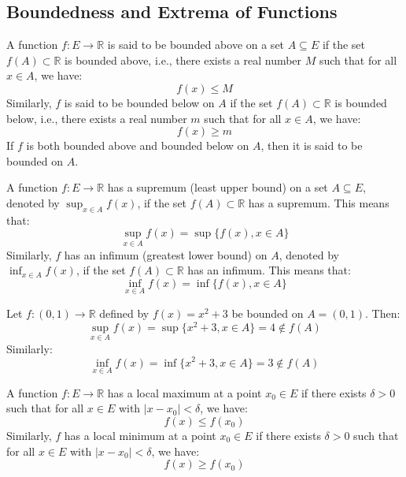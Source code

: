 \subsection{Boundedness and Extrema of Functions}
\begin{definition}
    A function $f : E \to \mathbb{R}$ is said to be bounded above on a set $A \subseteq E$ if the set $f(A) \subset \mathbb{R}$ is bounded above, i.e., there exists a real number $M$ such that for all $x \in A$, we have:
    \[
        f(x) \leq M
    \]
    Similarly, $f$ is said to be bounded below on $A$ if the set $f(A) \subset \mathbb{R}$ is bounded below, i.e., there exists a real number $m$ such that for all $x \in A$, we have:
    \[
        f(x) \geq m
    \]
    If $f$ is both bounded above and bounded below on $A$, then it is said to be bounded on $A$.
\end{definition}

\begin{definition}
    A function $f : E \to \mathbb{R}$ has a supremum (least upper bound) on a set $A \subseteq E$, denoted by $\sup_{x \in A} f(x)$, if the set $f(A) \subset \mathbb{R}$ has a supremum. This means that:
    \[
        \sup_{x \in A} f(x) = \sup \{f(x), x \in A\}
    \]
    Similarly, $f$ has an infimum (greatest lower bound) on $A$, denoted by $\inf_{x \in A} f(x)$, if the set $f(A) \subset \mathbb{R}$ has an infimum. This means that:
    \[
        \inf_{x \in A} f(x) = \inf \{f(x), x \in A\}
    \]
\end{definition}
\begin{eg}
    Let $f: (0,1) \to \mathbb{R}$ defined by $f(x) = x^2 + 3$ be bounded on $A = (0,1)$. Then:
    \[
        \sup_{x \in A} f(x) = \sup \{x^2 + 3, x \in A\} = 4 \notin f(A)
    \]
    Similarly:
    \[
        \inf_{x \in A} f(x) = \inf \{x^2 + 3, x \in A\} = 3 \notin f(A)
    \]
\end{eg}

\begin{definition}
    A function $f: E \to \mathbb{R}$ has a local maximum at a point $x_0 \in E$ if there exists $\delta > 0$ such that for all $x \in E$ with $|x - x_0| < \delta$, we have:
    \[
        f(x) \leq f(x_0)
    \]
    Similarly, $f$ has a local minimum at a point $x_0 \in E$ if there exists $\delta > 0$ such that for all $x \in E$ with $|x - x_0| < \delta$, we have:
    \[
        f(x) \geq f(x_0)
    \]
\end{definition}

